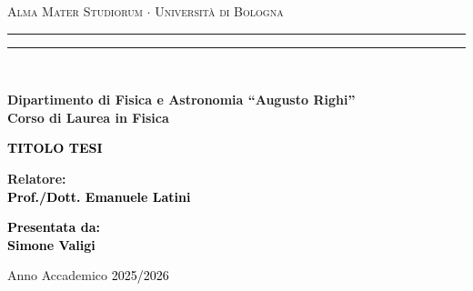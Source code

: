 \begin{titlepage}

    \begin{center}
        {{\Large{\textsc{Alma Mater Studiorum $\cdot$ Universit\`a di Bologna}}}}
        \rule[0.1cm]{15.8cm}{0.1mm}
        \rule[0.5cm]{15.8cm}{0.6mm}
        \\\vspace{3mm}

        {\small{\bf Dipartimento di Fisica e Astronomia “Augusto Righi”\\
                Corso di Laurea in Fisica}}

    \end{center}

    \vspace{23mm}

    \begin{center}\textcolor{black}{
            {\LARGE{\bf TITOLO TESI}}\\
        }\end{center}

    \vspace{50mm} \par \noindent

    \begin{minipage}[t]{0.47\textwidth}
        {\large{\bf Relatore: \vspace{2mm}\\\textcolor{black}{
                    Prof./Dott. Emanuele Latini}}}
    \end{minipage}
    \hfill
    \begin{minipage}[t]{0.47\textwidth}\raggedleft \textcolor{black}{
            {\large{\bf Presentata da:
                        \vspace{2mm}\\
                        Simone Valigi}}}
    \end{minipage}

    \vspace{40mm}

    \begin{center}
        Anno Accademico \textcolor{black}{ 2025/2026}
    \end{center}

\end{titlepage}